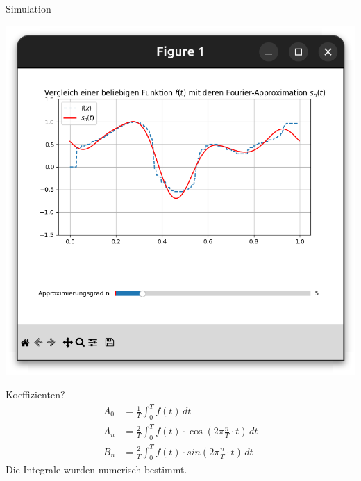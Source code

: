 \documentclass[12pt]{beamer}
\begin{document}
\begin{frame}{Simulation}
	\begin{minipage}{0.49\linewidth}
		\includegraphics[width=\linewidth]{simscreenshot.png}
	\end{minipage}
	\begin{minipage}{0.39\linewidth}
		\begin{block}{Koeffizienten?}
			\vspace*{-1ex}
			\begin{align*}
				A_0 &= \frac{1}{T} \int_{0}^T f(t) \, dt \\[2ex]
				A_n &= \frac{2}{T} \int_{0}^T f(t) \cdot \cos(2\pi \frac{n}{T} \cdot t) \, dt \\[2ex]
				B_n &= \frac{2}{T} \int_{0}^T f(t) \cdot sin(2\pi \frac{n}{T} \cdot t) \, dt
			\end{align*}
			Die Integrale wurden numerisch bestimmt.
		\end{block}
	\end{minipage}
\end{frame}
\end{document}
